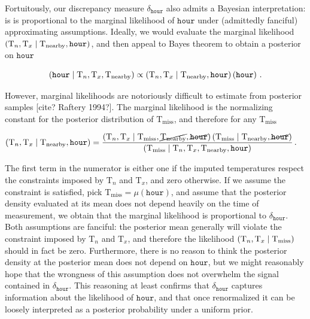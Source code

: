 \documentclass[letter]{article}
\newcommand{\genericdel}[3]{%
      \left#1#3\right#2
    }
\newcommand{\del}[1]{\genericdel(){#1}}
\let\Pr\relax
\DeclareMathOperator{\Pr}{\mathbb{P}}
\newcommand{\T}{\mathrm{T}}
\newcommand{\Tn}{\T_{n}}
\newcommand{\Tx}{\T_{x}}
\newcommand{\miss}{\mathrm{miss}}
\newcommand{\obs}{\mathrm{nearby}}
\newcommand{\hour}{\mathtt{hour}}
\newcommand{\discrepancy}{\delta}
\begin{document}
        Fortuitously, our discrepancy measure \(\discrepancy_\hour\) also admits a Bayesian interpretation: is is proportional to the marginal likelihood of \(\hour\) under (admittedly fanciful) approximating assumptions.
Ideally, we would evaluate the marginal likelihood \(\Pr\del{\Tn,\Tx \mid \T_\obs, \hour}\), and then appeal to Bayes theorem to obtain a posterior on \(\hour\)

\begin{equation}
    \Pr\del{\hour \mid \Tn, \Tx, \T_\obs } \propto \Pr\del{\Tn,\Tx \mid \T_\obs, \hour} \Pr\del{\hour}\,.
\end{equation}

However, marginal likelihoods are notoriously difficult to estimate from posterior samples {[}cite? Raftery 1994?{]}.
The marginal likelihood is the normalizing constant for the posterior distribution of \(\T_\miss\), and therefore for any \(\T_\miss\)

\begin{equation}
\begin{split}
    \Pr\del{\Tn,\Tx \mid \T_\obs, \hour} &= \frac{
        \Pr\del{\Tn,\Tx \mid \T_\miss, \cancel{\T_\obs}, \cancel{\hour}} 
        \Pr\del{\T_\miss \mid \T_\obs, \cancel{\hour}}
    } { 
        \Pr\del{\T_\miss \mid \Tn,\Tx,\T_\obs, \hour}
    }\,.
\end{split}
\end{equation}

The first term in the numerator is either one if the imputed temperatures respect the constraints imposed by \(\Tn\) and \(\Tx\), and zero otherwise.
If we assume the constraint is satisfied,
pick \(\T_\miss = \mu\del{\hour}\),
and assume that the posterior density evaluated at its mean
does not depend heavily on the time of measurement,
we obtain that the marginal likelihood is proportional to \(\discrepancy_\hour\).
Both assumptions are fanciful: the posterior mean generally will violate the constraint imposed by \(\Tn\) and \(\Tx\), and therefore the likelihood \(\Pr\del{\Tn,\Tx \mid \T_\miss}\) should in fact be zero.
Furthermore, there is no reason to think the posterior density at the posterior mean does not depend on \(\hour\), but we might reasonably hope that the wrongness of this assumption does not overwhelm the signal contained in \(\discrepancy_\hour\).
This reasoning at least confirms that \(\discrepancy_\hour\) captures information about the likelihood of \(\hour\), and that once renormalized it can be loosely interpreted as a posterior probability under a uniform prior.
    
\end{document}
